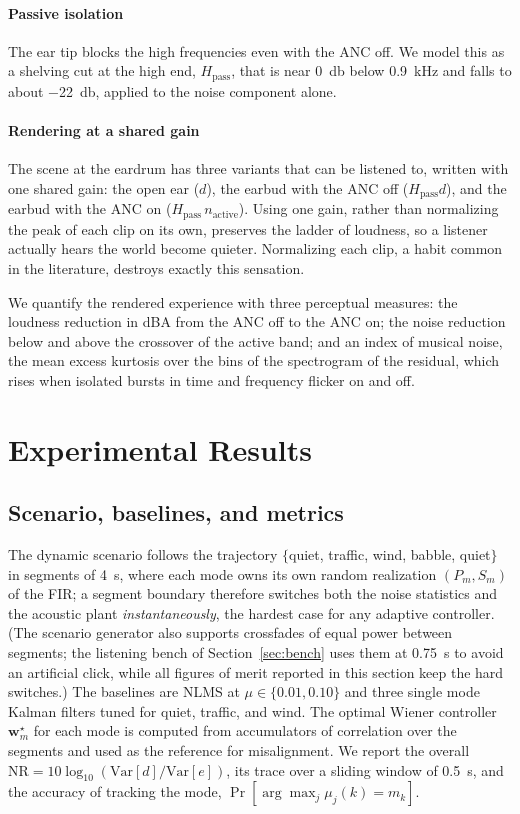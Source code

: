 \documentclass[conference]{IEEEtran}
\begin{document}
\paragraph{Passive isolation} The ear tip blocks the high frequencies even with the
ANC off. We model this as a shelving cut at the high end, $H_{\mathrm{pass}}$, that
is near \SI{0}{\decibel} below \SI{0.9}{\kilo\hertz} and falls to about
\SI{-22}{\decibel}, applied to the noise component alone.

\paragraph{Rendering at a shared gain} The scene at the eardrum has three variants
that can be listened to, written with one shared gain: the open ear ($d$), the
earbud with the ANC off ($H_{\mathrm{pass}}d$), and the earbud with the ANC on
($H_{\mathrm{pass}}\,n_{\mathrm{active}}$). Using one gain, rather than normalizing
the peak of each clip on its own, preserves the ladder of loudness, so a listener
actually hears the world become quieter. Normalizing each clip, a habit common in
the literature, destroys exactly this sensation.

We quantify the rendered experience with three perceptual measures: the loudness
reduction in dBA from the ANC off to the ANC on; the noise reduction below and above
the crossover of the active band; and an index of musical noise, the mean excess
kurtosis over the bins of the spectrogram of the residual, which rises when isolated
bursts in time and frequency flicker on and off.

\section{Experimental Results}
\label{sec:results}

\subsection{Scenario, baselines, and metrics}
The dynamic scenario follows the trajectory $\{$quiet, traffic, wind, babble,
quiet$\}$ in segments of \SI{4}{\second}, where each mode owns its own random
realization $(P_m,S_m)$ of the FIR; a segment boundary therefore switches both
the noise statistics and the acoustic plant \emph{instantaneously}, the hardest
case for any adaptive controller. (The scenario generator also supports
crossfades of equal power between segments; the listening bench of
Section~\ref{sec:bench} uses them at \SI{0.75}{\second} to avoid an artificial
click, while all figures of merit reported in this section keep the hard
switches.) The baselines are NLMS at
$\mu\in\{0.01,0.10\}$ and three single mode Kalman filters tuned for quiet, traffic,
and wind. The optimal Wiener controller $\mathbf{w}^\star_m$ for each mode is
computed from accumulators of correlation over the segments and used as the
reference for misalignment. We report the overall
$\mathrm{NR}=10\log_{10}(\mathrm{Var}[d]/\mathrm{Var}[e])$, its trace over a sliding
window of \SI{0.5}{\second}, and the accuracy of tracking the mode,
$\Pr[\arg\max_j \mu_j(k)=m_k]$.
\end{document}
